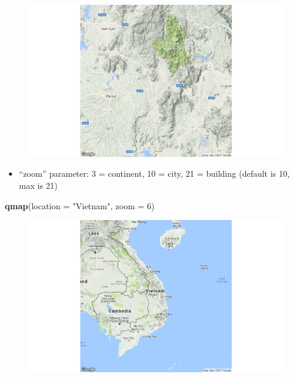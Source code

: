\documentclass[oneside]{memoir}
\newenvironment{Shaded}{\begin{snugshade}}{\end{snugshade}}
\newcommand{\KeywordTok}[1]{\textcolor[rgb]{0.13,0.29,0.53}{\textbf{#1}}}
\newcommand{\DataTypeTok}[1]{\textcolor[rgb]{0.13,0.29,0.53}{#1}}
\newcommand{\DecValTok}[1]{\textcolor[rgb]{0.00,0.00,0.81}{#1}}
\newcommand{\StringTok}[1]{\textcolor[rgb]{0.31,0.60,0.02}{#1}}
\newcommand{\NormalTok}[1]{#1}
\providecommand{\tightlist}{%
  \setlength{\itemsep}{0pt}\setlength{\parskip}{0pt}}
\theoremstyle{definition}
\theoremstyle{definition}
\theoremstyle{definition}
\theoremstyle{remark}
\begin{document}
\begin{figure}
\centering
\includegraphics{qmap1.png}
\caption{}
\end{figure}

\begin{itemize}
\tightlist
\item
  ``zoom'' parameter: 3 = continent, 10 = city, 21 = building (default
  is 10, max is 21)
\end{itemize}

\begin{Shaded}
\begin{Highlighting}[]
\KeywordTok{qmap}\NormalTok{(}\DataTypeTok{location =} \StringTok{"Vietnam"}\NormalTok{, }\DataTypeTok{zoom =} \DecValTok{6}\NormalTok{)}
\end{Highlighting}
\end{Shaded}

\begin{figure}
\centering
\includegraphics{qmap2.png}
\caption{}
\end{figure}
\end{document}
